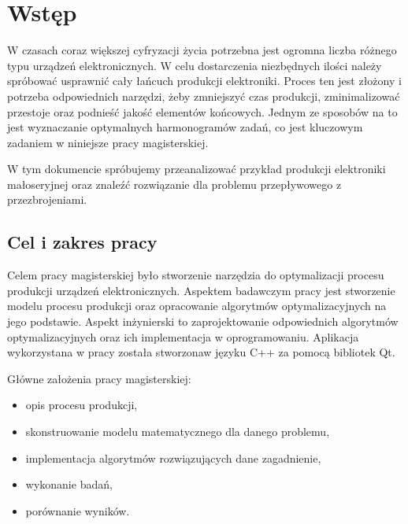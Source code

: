 \chapter{Wstęp}

W czasach coraz większej cyfryzacji życia potrzebna jest ogromna liczba różnego typu urządzeń elektronicznych.
W celu dostarczenia niezbędnych ilości należy spróbować usprawnić cały łańcuch produkcji elektroniki. Proces ten jest złożony i potrzeba odpowiednich narzędzi, żeby zmniejszyć czas produkcji, zminimalizować przestoje oraz podnieść jakość elementów końcowych. Jednym ze sposobów na to jest wyznaczanie optymalnych harmonogramów zadań, co jest kluczowym zadaniem w niniejsze pracy magisterskiej.

W tym dokumencie spróbujemy przeanalizować przykład produkcji elektroniki małoseryjnej oraz znaleźć rozwiązanie dla problemu przepływowego z przezbrojeniami.

\section{Cel i zakres pracy}
Celem pracy magisterskiej było stworzenie narzędzia do optymalizacji procesu produkcji urządzeń elektronicznych.
Aspektem badawczym pracy jest stworzenie modelu procesu produkcji oraz opracowanie algorytmów optymalizacyjnych na jego podstawie.
Aspekt inżynierski to zaprojektowanie odpowiednich algorytmów optymalizacyjnych oraz ich implementacja w oprogramowaniu. Aplikacja wykorzystana w pracy została stworzona\linebreak w języku C++ za pomocą bibliotek Qt.

\breakparagraph{}
Główne założenia pracy magisterskiej:
\begin{itemize}
	\item opis procesu produkcji,
	\item skonstruowanie modelu matematycznego dla danego problemu,
	\item implementacja algorytmów rozwiązujących dane zagadnienie,
	\item wykonanie badań,
	\item porównanie wyników.
\end{itemize}

